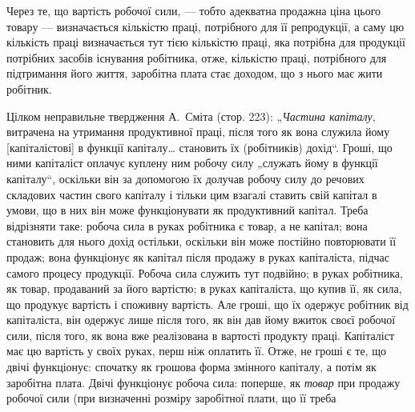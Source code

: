 Через те, що вартість робочої сили, — тобто адекватна продажна ціна цього товару — визначається
кількістю праці, потрібного для її репродукції, а саму цю кількість праці визначається тут тією
кількістю праці, яка потрібна для продукції потрібних засобів існування робітника, отже, кількістю
праці, потрібного для підтримання його життя, заробітна плата стає доходом, що з нього має жити
робітник.

Цілком неправильне твердження А.~Сміта (стор. 223): „\emph{Частина капіталу}, витрачена на утримання
продуктивної праці, після того як вона служила йому [капіталістові] в функції капіталу\dots{} становить
їх (робітників) дохід“. Гроші, що ними капіталіст оплачує куплену ним робочу силу „служать йому в
функції капіталу“, оскільки він за допомогою їх долучав робочу силу до речових складових частин
свого капіталу і тільки цим взагалі ставить свій капітал в умови, що в них він може функціонувати як
продуктивний капітал. Треба відрізняти таке: робоча сила в руках робітника є товар, а не капітал;
вона становить для нього дохід остільки, оскільки він може постійно повторювати її продаж; вона
функціонує як капітал після продажу в руках капіталіста, підчас самого процесу продукції. Робоча
сила служить тут подвійно; в руках робітника, як товар, продаваний за його вартістю; в руках
капіталіста, що купив її, як сила, що продукує вартість і споживну вартість. Але гроші, що їх
одержує робітник від капіталіста, він одержує лише після того, як він дав йому вжиток своєї робочої
сили, після того, як вона вже реалізована в вартості продукту праці. Капіталіст має цю вартість у
своїх руках,
перш ніж оплатить її. Отже, не гроші є те, що двічі функціонує: спочатку як грошова форма змінного
капіталу, а потім як заробітна плата. Двічі функціонує робоча сила: поперше, як \emph{товар} при продажу
робочої сили (при визначенні розміру заробітної плати, що її треба
\parbreak{}  %
